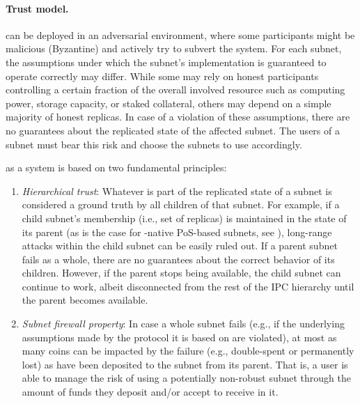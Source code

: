 \paragraph{Trust model.}

\ipc can be deployed in an adversarial environment, where some participants might be malicious (Byzantine) and actively try to subvert the system.
For each subnet, the assumptions under which the subnet's implementation is guaranteed to operate correctly may differ.
While some may rely on honest participants controlling a certain fraction of the overall involved resource such as computing power, storage capacity, or staked collateral,
others may depend on a simple majority of honest replicas.
In case of a violation of these assumptions, there are no guarantees about the replicated state of the affected subnet.
The users of a subnet must bear this risk and choose the subnets to use accordingly.

\ipc as a system is based on two fundamental principles:
\begin{enumerate}
    
    \item \emph{Hierarchical trust}: Whatever is part of the replicated state of a subnet is considered a ground truth by all children of that subnet.
    For example, if a child subnet's membership (i.e., set of replicas) is maintained in the state of its parent (as is the case for \ipc-native PoS-based subnets, see ),
    long-range attacks within the child subnet can be easily ruled out. If a parent subnet fails as a whole, there are no guarantees about the correct behavior of its children. However, if the parent stops being available, the child subnet can continue to work, albeit disconnected from the rest of the IPC hierarchy until the parent becomes available.

    \item \emph{Subnet firewall property}: In case a whole subnet fails (e.g., if the underlying assumptions made by the protocol it is based on are violated),
    at most as many coins can be impacted by the failure (e.g., double-spent or permanently lost) as have been deposited to the subnet from its parent.
    That is, a user is able to manage the risk of using a potentially non-robust subnet through the amount of funds they deposit and/or accept to receive in it.
\end{enumerate}


